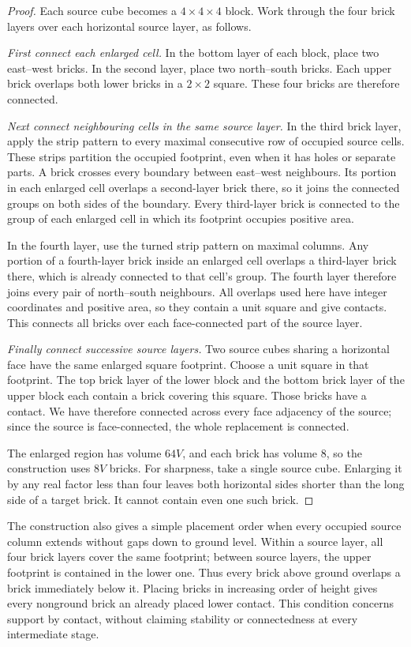 \documentclass[10pt,reqno]{amsart}
\begin{document}
\begin{proof}
Each source cube becomes a $4\times4\times4$ block. Work through the
four brick layers over each horizontal source layer, as follows.

\emph{First connect each enlarged cell.} In the bottom layer of each
block, place two east--west bricks. In the second layer, place two
north--south bricks. Each upper brick overlaps both lower bricks in a
$2\times2$ square. These four bricks are therefore connected.

\emph{Next connect neighbouring cells in the same source layer.}
In the third brick layer, apply the strip pattern to every maximal
consecutive row of occupied source cells. These strips partition the
occupied footprint, even when it has holes or separate parts. A brick
crosses every boundary between east--west neighbours. Its portion in
each enlarged cell overlaps a second-layer brick there, so it joins the
connected groups on both sides of the boundary. Every third-layer brick
is connected to the group of each enlarged cell in which its footprint
occupies positive area.

In the fourth layer, use the turned strip pattern on maximal columns.
Any portion of a fourth-layer brick inside an enlarged cell overlaps
a third-layer brick there, which is already connected to that cell's
group. The fourth layer therefore joins every pair of north--south
neighbours. All overlaps used here have integer coordinates and positive
area, so they contain a unit square and give contacts. This connects
all bricks over each face-connected part of the source layer.

\emph{Finally connect successive source layers.} Two source cubes
sharing a horizontal face have the same enlarged square footprint.
Choose a unit square in that footprint. The top brick layer of the
lower block and the bottom brick layer of the upper block each contain
a brick covering this square. Those bricks have a contact. We have
therefore connected across every face adjacency of the source; since
the source is face-connected, the whole replacement is connected.

The enlarged region has volume $64V$, and each brick has volume $8$,
so the construction uses $8V$ bricks. For sharpness, take a single
source cube. Enlarging it by any real factor less than four leaves both
horizontal sides shorter than the long side of a target brick.
It cannot contain even one such brick.
\end{proof}

The construction also gives a simple placement order when every occupied
source column extends without gaps down to ground level. Within a source layer,
all four brick layers cover the same footprint; between source layers,
the upper footprint is contained in the lower one. Thus every brick
above ground overlaps a brick immediately below it. Placing bricks in
increasing order of height gives every nonground brick an already placed
lower contact. This condition concerns support by contact, without
claiming stability or connectedness at every intermediate stage.
\end{document}

